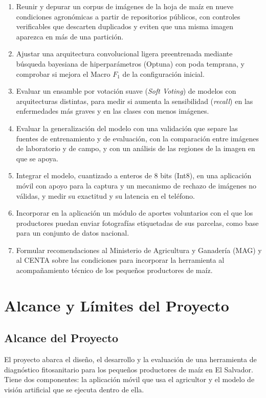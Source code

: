\begin{enumerate}
\item Reunir y depurar un corpus de im\'agenes de la hoja de ma\'iz en nueve condiciones agron\'omicas a partir de repositorios p\'ublicos, con controles verificables que descarten duplicados y eviten que una misma imagen aparezca en m\'as de una partici\'on.
\item Ajustar una arquitectura convolucional ligera preentrenada mediante b\'usqueda bayesiana de hiperpar\'ametros (Optuna) con poda temprana, y comprobar si mejora el Macro $F_1$ de la configuraci\'on inicial.
\item Evaluar un ensamble por votaci\'on suave (\textit{Soft Voting}) de modelos con arquitecturas distintas, para medir si aumenta la sensibilidad (\textit{recall}) en las enfermedades m\'as graves y en las clases con menos im\'agenes.
\item Evaluar la generalizaci\'on del modelo con una validaci\'on que separe las fuentes de entrenamiento y de evaluaci\'on, con la comparaci\'on entre im\'agenes de laboratorio y de campo, y con un an\'alisis de las regiones de la imagen en que se apoya.
\item Integrar el modelo, cuantizado a enteros de 8 bits (Int8), en una aplicaci\'on m\'ovil con apoyo para la captura y un mecanismo de rechazo de im\'agenes no v\'alidas, y medir su exactitud y su latencia en el tel\'efono.
\item Incorporar en la aplicaci\'on un m\'odulo de aportes voluntarios con el que los productores puedan enviar fotograf\'ias etiquetadas de sus parcelas, como base para un conjunto de datos nacional.
\item Formular recomendaciones al Ministerio de Agricultura y Ganader\'ia (MAG) y al CENTA sobre las condiciones para incorporar la herramienta al acompa\~namiento t\'ecnico de los peque\~nos productores de ma\'iz.
\end{enumerate}

\section{Alcance y L\'imites del Proyecto}

\subsection{Alcance del Proyecto}

El proyecto abarca el dise\~no, el desarrollo y la evaluaci\'on de una herramienta de diagn\'ostico fitosanitario para los peque\~nos productores de ma\'iz en El Salvador. Tiene dos componentes: la aplicaci\'on m\'ovil que usa el agricultor y el modelo de visi\'on artificial que se ejecuta dentro de ella.

